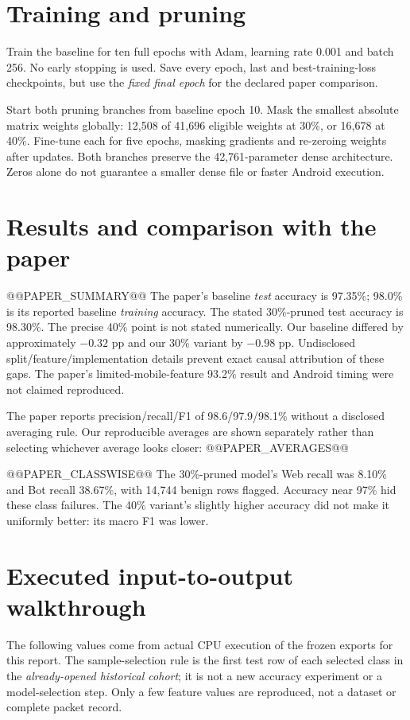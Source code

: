 \documentclass[11pt,a4paper,oneside]{report}
\begin{document}
\section{Training and pruning}
Train the baseline for ten full epochs with Adam, learning rate 0.001 and batch 256. No early stopping is used. Save every epoch, last and best-training-loss checkpoints, but use the \emph{fixed final epoch} for the declared paper comparison.

Start both pruning branches from baseline epoch 10. Mask the smallest absolute matrix weights globally: 12,508 of 41,696 eligible weights at 30\%, or 16,678 at 40\%. Fine-tune each for five epochs, masking gradients and re-zeroing weights after updates. Both branches preserve the 42,761-parameter dense architecture. Zeros alone do not guarantee a smaller dense file or faster Android execution.

\section{Results and comparison with the paper}
@@PAPER_SUMMARY@@
The paper's baseline \emph{test} accuracy is 97.35\%; 98.0\% is its reported baseline \emph{training} accuracy. The stated 30\%-pruned test accuracy is 98.30\%. The precise 40\% point is not stated numerically. Our baseline differed by approximately $-0.32$ pp and our 30\% variant by $-0.98$ pp. Undisclosed split/feature/implementation details prevent exact causal attribution of these gaps. The paper's limited-mobile-feature 93.2\% result and Android timing were not claimed reproduced.

The paper reports precision/recall/F1 of 98.6/97.9/98.1\% without a disclosed averaging rule. Our reproducible averages are shown separately rather than selecting whichever average looks closer:
@@PAPER_AVERAGES@@

@@PAPER_CLASSWISE@@
The 30\%-pruned model's Web recall was 8.10\% and Bot recall 38.67\%, with 14,744 benign rows flagged. Accuracy near 97\% hid these class failures. The 40\% variant's slightly higher accuracy did not make it uniformly better: its macro F1 was lower.

\section{Executed input-to-output walkthrough}
The following values come from actual CPU execution of the frozen exports for this report. The sample-selection rule is the first test row of each selected class in the \emph{already-opened historical cohort}; it is not a new accuracy experiment or a model-selection step. Only a few feature values are reproduced, not a dataset or complete packet record.
\end{document}
